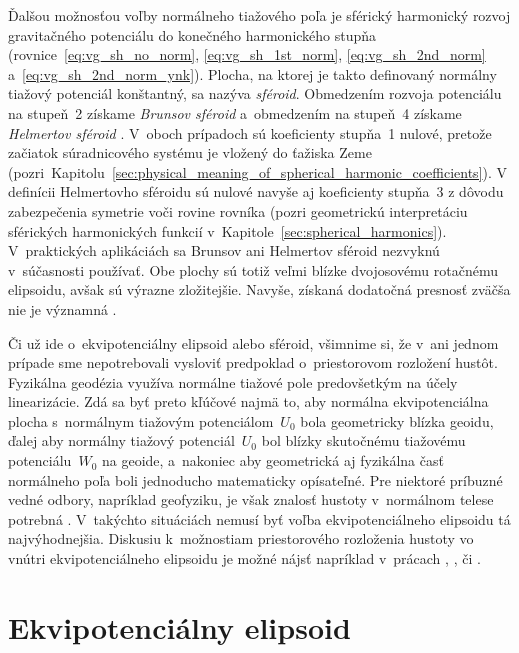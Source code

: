 \documentclass[a4paper,12pt]{book}
\begin{document}
Ďalšou možnosťou voľby normálneho tiažového poľa je sférický harmonický rozvoj 
gravitačného potenciálu do konečného harmonického stupňa 
(rovnice~\ref{eq:vg_sh_no_norm}, \ref{eq:vg_sh_1st_norm}, 
\ref{eq:vg_sh_2nd_norm} a~\ref{eq:vg_sh_2nd_norm_ynk}).  Plocha, na ktorej je 
takto definovaný normálny tiažový potenciál konštantný, sa nazýva 
\emph{sféroid}.  Obmedzením rozvoja potenciálu na stupeň~2 získame 
\emph{Brunsov sféroid} a~obmedzením na stupeň~4 získame \emph{Helmertov 
sféroid} \parencite{Moritz1967}.  V~oboch prípadoch sú koeficienty stupňa~1 
nulové, pretože začiatok súradnicového systému je vložený do ťažiska Zeme 
(pozri~Kapitolu~\ref{sec:physical_meaning_of_spherical_harmonic_coefficients}).  
V definícii Helmertovho sféroidu sú nulové navyše aj koeficienty stupňa~3 
z dôvodu zabezpečenia symetrie voči rovine rovníka (pozri geometrickú 
interpretáciu sférických harmonických funkcií 
v~Kapitole~\ref{sec:spherical_harmonics}).   V~praktických aplikáciách sa  
Brunsov ani Helmertov sféroid nezvyknú v~súčasnosti používať.  Obe plochy sú 
totiž veľmi blízke dvojosovému rotačnému elipsoidu, avšak sú výrazne 
zložitejšie.  Navyše, získaná dodatočná presnosť zväčša nie je významná 
\parencite{Moritz1967}.

Či už ide o~ekvipotenciálny elipsoid alebo sféroid, všimnime si, že v~ani 
jednom prípade sme nepotrebovali vysloviť predpoklad o~priestorovom rozložení 
hustôt.  Fyzikálna geodézia využíva normálne tiažové pole predovšetkým na účely 
linearizácie.  Zdá sa byť preto kľúčové najmä to, aby normálna ekvipotenciálna 
plocha s~normálnym tiažovým potenciálom~$U_0$ bola geometricky blízka geoidu, 
ďalej aby normálny tiažový potenciál~$U_0$ bol blízky skutočnému tiažovému 
potenciálu~$W_0$ na geoide, a~nakoniec aby geometrická aj fyzikálna časť 
normálneho poľa boli jednoducho matematicky opísateľné.  Pre niektoré príbuzné 
vedné odbory, napríklad geofyziku, je však znalosť hustoty v~normálnom telese 
potrebná \parencite{Karcol2017}.  V~takýchto situáciách nemusí byť voľba 
ekvipotenciálneho elipsoidu tá najvýhodnejšia.  Diskusiu k~možnostiam 
priestorového rozloženia hustoty vo vnútri ekvipotenciálneho elipsoidu je možné 
nájsť napríklad v~prácach \textcite{MoritzTheFigureOfTheEarth}, 
\textcite{TorgeGeodesy}, \textcite{Conway2000} či \textcite{Karcol2017}.



\section{Ekvipotenciálny elipsoid}
\label{sec:equipotential_ellipsoid}
\end{document}
